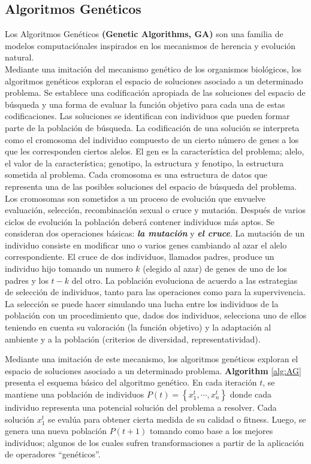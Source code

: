 \documentclass[9pt,a4paper,twoside]{rho-class/rho}
\begin{document}
        \subsection{Algoritmos Genéticos}
            Los Algoritmos Genéticos \textbf{(Genetic Algorithms, GA)} \cite{Michalewicz1999, Back1997, Diaz1996} son una familia de modelos computaciónales inspirados en los mecanismos de herencia y evolución natural.\vspace{1mm} \\ 
            Mediante una imitación del mecanismo genético de los organismos biológicos, los algoritmos genéticos exploran el espacio de soluciones asociado a un determinado problema. Se establece una codificación apropiada de las soluciones del espacio de búsqueda y una forma de evaluar la función objetivo para cada una de estas codificaciones. Las soluciones se identifican con individuos que pueden formar parte de la población de búsqueda. La codificación de una solución se interpreta como el cromosoma del individuo compuesto de un cierto número de genes a los que les corresponden ciertos alelos. El gen es la característica del problema; alelo, el valor de la característica; genotipo, la estructura y fenotipo, la estructura sometida al problema. Cada cromosoma es una estructura de datos que representa una de las posibles soluciones del espacio de búsqueda del problema. Los cromosomas son sometidos a un proceso de evolución que envuelve evaluación, selección, recombinación sexual o cruce y mutación. Después de varios ciclos de evolución la población deberá contener individuos más aptos.
            Se consideran dos operaciones básicas: \textbf{\textit{la mutación}} y \textbf{\textit{el cruce}}. La mutación de un individuo consiste en modificar uno o varios genes cambiando al azar el alelo correspondiente. El cruce de dos individuos, llamados padres, produce un individuo hijo tomando un numero $k$ (elegido al azar) de genes de uno de los padres y los $t-k$ del otro. La población evoluciona de acuerdo a las estrategias de selección de individuos, tanto para las operaciones como para la supervivencia. La selección se puede hacer simulando una lucha entre los individuos de la población con un procedimiento que, dados dos individuos, selecciona uno de ellos teniendo en cuenta su valoración (la función objetivo) y la adaptación al ambiente y a la población (criterios de diversidad, representatividad).

            Mediante una imitación de este mecanismo, los algoritmos genéticos exploran el espacio de soluciones asociado a un determinado problema. \textbf{Algorithm} \ref{alg:AG} presenta el esquema básico del algoritmo genético. En cada iteración $t$, se mantiene una población de individuos $P\left(t\right)=\left\{{x}_{1}^{t},\cdots, {x}_{n}^{t}\right\}$ donde cada individuo representa una potencial solución del problema a resolver. Cada solución ${x}_{1}^{t}$ se evalúa para obtener cierta medida de su calidad o fitness. Luego, se genera una nueva población $P\left(t + 1\right)$ tomando como base a los mejores individuos; algunos de los cuales sufren transformaciones a partir de la aplicación de operadores “genéticos”.
            
\end{document}

